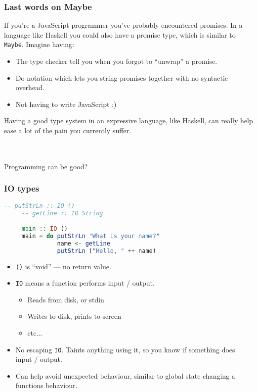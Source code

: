 \documentclass{beamer}
\begin{document}
\begin{frame}
  \frametitle{Last words on Maybe}
  
  If you're a JavaScript programmer you've probably encountered
  promises. In a language like Haskell you could also have a promise
  type, which is similar to \texttt{Maybe}. Imagine having:

  \begin{itemize}
  \pause
  \item The type checker tell you when you forgot to ``unwrap'' a promise.
  \pause
  \item Do notation which lets you string promises together with no syntactic overhead.
  \pause
  \item Not having to write JavaScript ;)
  \end{itemize}

  Having a good type system in an expressive language, like Haskell,
  can really help ease a lot of the pain you currently suffer.

  \pause \\~\\

  Programming can be good?
\end{frame}

\begin{frame}[fragile]
  \frametitle{IO types}

  \begin{lstlisting}[frame=single, language=Haskell, breaklines=true, basicstyle=\ttfamily\tiny]
     -- putStrLn :: IO ()
     -- getLine :: IO String

     main :: IO ()
     main = do putStrLn "What is your name?"
               name <- getLine
               putStrLn ("Hello, " ++ name)
  \end{lstlisting}

  \begin{itemize}
  \pause
  \item \texttt{()} is ``void'' --- no return value.
  \pause
  \item \texttt{IO} means a function performs input / output.
    \begin{itemize}
    \pause
    \item Reads from disk, or stdin
    \pause
    \item Writes to disk, prints to screen
    \pause
    \item etc...
    \end{itemize}
  \item No escaping \texttt{IO}. Taints anything using it, so you know if something does input / output.
  \pause
  \item Can help avoid unexpected behaviour, similar to global state changing a functions behaviour.
  \end{itemize}
\end{frame}
\end{document}
